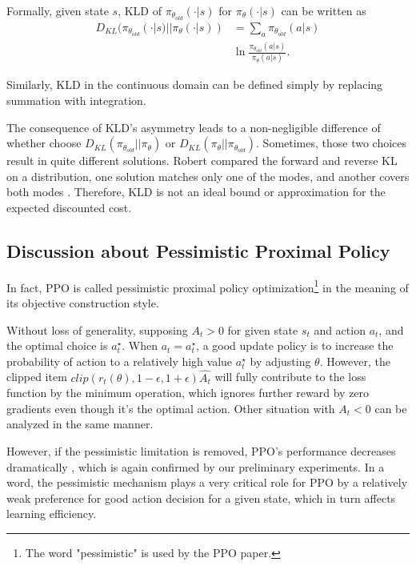 \documentclass{article}
\begin{document}
Formally, given state $s$, KLD of $\pi_{\theta_{old}}(\cdot|s)$  for  $\pi_{\theta}(\cdot|s)$  can be written as
\begin{equation}\label{DPP}
\begin{split}
D_{KL}(\pi_{\theta_{old}}(\cdot|s)||\pi_{\theta}(\cdot|s))&=\sum_{a}{}\pi_{\theta_{old}}(a|s)\\
&\ln\frac{\pi_{\theta_{old}}(a|s)}{\pi_{\theta}(a|s)}.
\end{split}
\end{equation}

Similarly, KLD in the continuous domain can be defined simply by replacing summation with integration.

The consequence of KLD's asymmetry leads to a non-negligible difference of whether choose $D_{KL}(\pi_{\theta_{old}}||\pi_{\theta})$ or $D_{KL}(\pi_{\theta}||\pi_{\theta_{old}})$. Sometimes, those two choices result in quite different solutions. Robert compared the forward and reverse KL on a distribution, one solution matches only one of the modes, and another covers both modes \cite{robert2014machine}. Therefore, KLD is not an ideal bound or approximation for the expected discounted cost. 

\subsection{Discussion about Pessimistic Proximal Policy}
In fact, PPO is called pessimistic proximal policy optimization\footnote{The word "pessimistic" is  used by the PPO paper.} in the meaning of its objective construction style.



Without loss of generality, supposing ${A_t} > 0$  for given state $s_t$ and action $a_t$, and the optimal choice is $a_t^\star$. When $a_t=a_t^\star$, a good update policy  is to increase the probability of action to a relatively high value $a_t^\star$ by adjusting $\theta$. However, the clipped item $clip(r_t(\theta), 1-\epsilon, 1+\epsilon)\hat{A_t}$ will fully contribute to the loss function by the minimum operation, which ignores further reward by zero gradients even though it's the optimal action. Other situation with ${A_t} < 0$ can be analyzed in the same manner.

However, if the pessimistic limitation is removed, PPO's performance decreases dramatically \cite{2017arXiv170706347S}, which is again confirmed by our preliminary experiments. In a word, the pessimistic mechanism plays a very critical role for PPO by a relatively weak preference for good action decision for a given state, which in turn affects learning efficiency.
\end{document}
